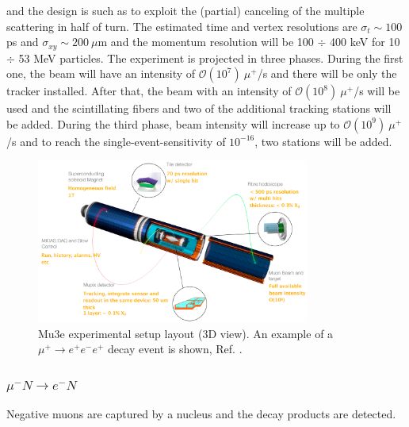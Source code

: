 and the design is such as to exploit the (partial) canceling of
the multiple scattering in half of turn. The estimated time and vertex resolutions are
$\sigma_t \sim 100$ ps and $\sigma_{xy} \sim 200 \ \mu$m and the momentum resolution will be 100 $\div$ 400 keV for 10 $\div$ 53
MeV particles. The experiment is projected in three phases. During the first one, the beam will have an intensity of $\mathcal{O}(10^7) \ \mu^+$/s 
and there will be only the tracker installed. After that, the beam with an intensity of $\mathcal{O}(10^8) \ \mu^+$/s will 
be used and the scintillating fibers and two of the additional tracking stations will be added.
During the third phase,  beam intensity will increase up to $\mathcal{O}(10^9) \ \mu^+$/s and to 
reach the single-event-sensitivity of $10^{-16}$, two  stations will be added.
\begin{figure}[!h]
\centering
\includegraphics[width =0.8\textwidth]{figures/png/Screenshot_20240321_143650}
\caption[Mu3e experiment.]{Mu3e experimental setup layout (3D view). An example of a $\mu^+ \rightarrow e^+ e^-  e^+ $ decay event is shown, Ref. \cite{papa}.}
\label{fig:mu3e}
\end{figure}









\subsubsection{$\mu^- N \rightarrow e^- N $}
Negative muons are captured by a nucleus and {\violet the decay products are detected}.


